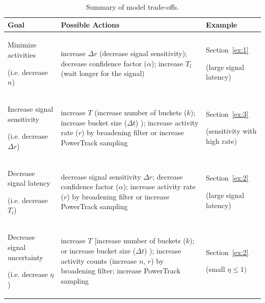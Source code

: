 \documentclass{article}
\begin{document}
%
\begin{table}[!h]
    \begin{tabular}{ p{3.0cm}| p{5.2cm} | p{2.6cm}}
     \hline
Goal  & Possible Actions & Example\\
\hline
Minimize activities 

(i.e. decrease $n$)  & 

increase $\Delta r$ (decrease signal sensitivity); decrease confidence factor ($\alpha$); 
	increase $T_l$ (wait longer for the signal)  & Section~\ref{ex:1} 

(large signal latency) \\

\hline	
Increase signal sensitivity 

(i.e. decrease $\Delta r$) & 

increase $T$ (increase number of buckets ($k$); increase bucket size ($\Delta t$) ); increase activity 
	rate ($r$) by broadening filter or increase PowerTrack sampling & Section~\ref{ex:3} 

(sensitivity with high rate) \\

\hline
Decrease signal latency  

(i.e. decrease $T_l$) & 

decrease signal sensitivity $\Delta r$; decrease confidence factor ($\alpha$); increase activity 
	rate ($r$) by broadening filter or increase PowerTrack sampling & Section~\ref{ex:2} 

(large signal latency) \\

\hline
Decrease signal uncertainty 

(i.e. decrease $\eta$) & 

increase $T$ [increase number of buckets ($k$); or increase bucket size ($\Delta t$) ); increase 
	activity counts (increase $n$, $r$) by broadening filter; increase PowerTrack sampling & 
	Section~\ref{ex:2} 

(small $\eta \le 1)$ \\
\hline
\end{tabular}
\caption{Summary of model trade-offs.}
\label{tab:tradeoff}
\end{table}
%
\end{document}
